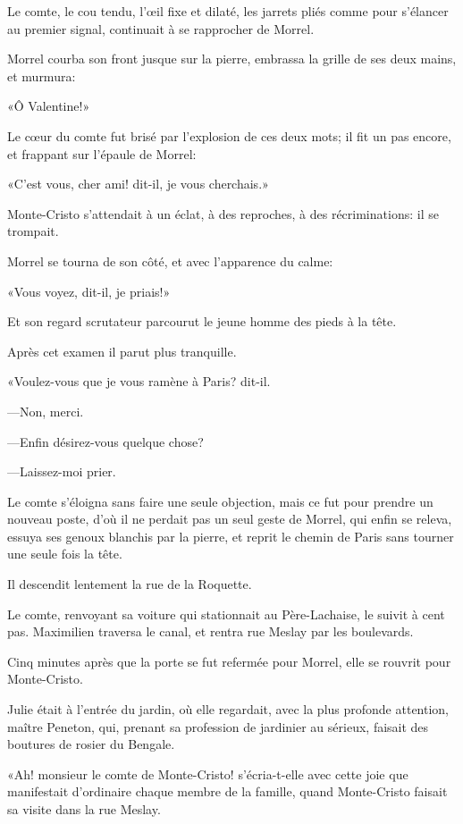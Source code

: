 Le comte, le cou tendu, l'œil fixe et dilaté, les jarrets pliés comme pour s'élancer au premier signal, continuait à se rapprocher de Morrel. 

Morrel courba son front jusque sur la pierre, embrassa la grille de ses deux mains, et murmura: 

«Ô Valentine!» 

Le cœur du comte fut brisé par l'explosion de ces deux mots; il fit un pas encore, et frappant sur l'épaule de Morrel: 

«C'est vous, cher ami! dit-il, je vous cherchais.» 

Monte-Cristo s'attendait à un éclat, à des reproches, à des récriminations: il se trompait. 

Morrel se tourna de son côté, et avec l'apparence du calme: 

«Vous voyez, dit-il, je priais!» 

Et son regard scrutateur parcourut le jeune homme des pieds à la tête. 

Après cet examen il parut plus tranquille. 

«Voulez-vous que je vous ramène à Paris? dit-il. 

—Non, merci. 

—Enfin désirez-vous quelque chose? 

—Laissez-moi prier. 

Le comte s'éloigna sans faire une seule objection, mais ce fut pour prendre un nouveau poste, d'où il ne perdait pas un seul geste de Morrel, qui enfin se releva, essuya ses genoux blanchis par la pierre, et reprit le chemin de Paris sans tourner une seule fois la tête. 

Il descendit lentement la rue de la Roquette. 

Le comte, renvoyant sa voiture qui stationnait au Père-Lachaise, le suivit à cent pas. Maximilien traversa le canal, et rentra rue Meslay par les boulevards. 

Cinq minutes après que la porte se fut refermée pour Morrel, elle se rouvrit pour Monte-Cristo. 

Julie était à l'entrée du jardin, où elle regardait, avec la plus profonde attention, maître Peneton, qui, prenant sa profession de jardinier au sérieux, faisait des boutures de rosier du Bengale. 

«Ah! monsieur le comte de Monte-Cristo! s'écria-t-elle avec cette joie que manifestait d'ordinaire chaque membre de la famille, quand Monte-Cristo faisait sa visite dans la rue Meslay. 

